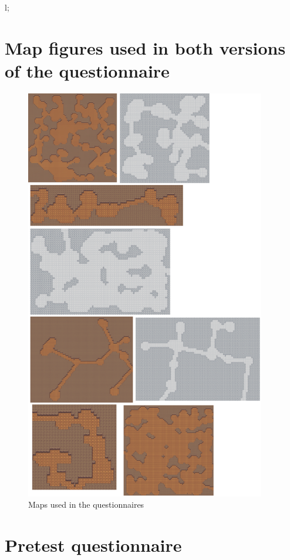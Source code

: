 l;\appendix

\chapter{Map figures used in both versions of the questionnaire}
\label{appendix:a}

\begin{figure}[h]
    \caption{Maps used in the questionnaires}
    \centerline{\includegraphics[width=10.505cm]{images/survey/allmaps.png}}
\end{figure}

\chapter{Pretest questionnaire}
\label{appendix:b}

